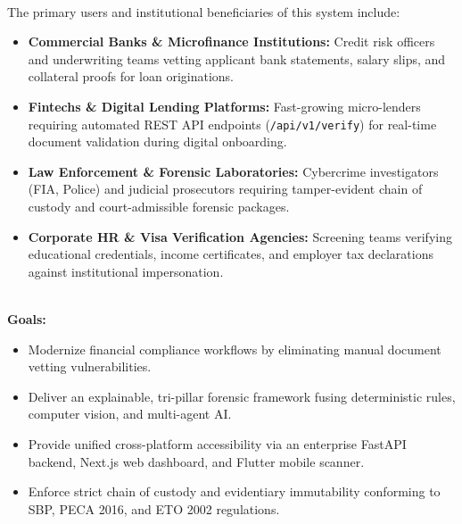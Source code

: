 \documentclass[12pt,a4paper]{article}
\begin{document}
\\[8pt]
The primary users and institutional beneficiaries of this system include:
\begin{itemize}
    \setlength\itemsep{4pt}
    \item \textbf{Commercial Banks \& Microfinance Institutions:} Credit risk officers and underwriting teams vetting applicant bank statements, salary slips, and collateral proofs for loan originations.
    \item \textbf{Fintechs \& Digital Lending Platforms:} Fast-growing micro-lenders requiring automated REST API endpoints (\texttt{/api/v1/verify}) for real-time document validation during digital onboarding.
    \item \textbf{Law Enforcement \& Forensic Laboratories:} Cybercrime investigators (FIA, Police) and judicial prosecutors requiring tamper-evident chain of custody and court-admissible forensic packages.
    \item \textbf{Corporate HR \& Visa Verification Agencies:} Screening teams verifying educational credentials, income certificates, and employer tax declarations against institutional impersonation.
\end{itemize}

\vspace{6pt}
\\[8pt]
\noindent\textbf{Goals:}
\begin{itemize}
    \setlength\itemsep{3pt}
    \item Modernize financial compliance workflows by eliminating manual document vetting vulnerabilities.
    \item Deliver an explainable, tri-pillar forensic framework fusing deterministic rules, computer vision, and multi-agent AI.
    \item Provide unified cross-platform accessibility via an enterprise FastAPI backend, Next.js web dashboard, and Flutter mobile scanner.
    \item Enforce strict chain of custody and evidentiary immutability conforming to SBP, PECA 2016, and ETO 2002 regulations.
\end{itemize}
\end{document}
